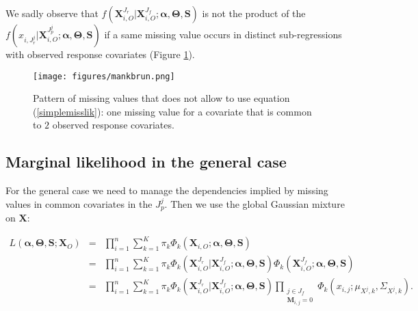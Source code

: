 \documentclass[12pt,a4paper]{report}
\begin{document}
		We sadly observe that $f(\boldsymbol{X}^{J_r}_{i,O}|\boldsymbol{X}^{J_f}_{i,O};\boldsymbol{\alpha},\boldsymbol{\Theta},\boldsymbol{S})$ is not the product of the $f(x_{i,J_r^j}|\boldsymbol{X}_{i,O}^{J_p^j};\boldsymbol{\alpha},\boldsymbol{\Theta},\boldsymbol{S}) $	if a same missing value occurs in distinct sub-regressions with observed response covariates (Figure \ref{mankbrun}).
		\begin{figure} 
		\centering
		\texttt{[image: figures/mankbrun.png]} 
		\caption{Pattern of missing values that does not allow to use equation (\ref{simplemisslik}): one missing value for a covariate that is common to $2$ observed response covariates.} \label{mankbrun}
		\end{figure}
	\subsection{Marginal likelihood in the general case}
		For the general case we need to manage the dependencies implied by missing values in common covariates in the $J_p^j$. Then we use the global Gaussian mixture on $\boldsymbol{X}$:
		
\begin{eqnarray}
L(\boldsymbol{\alpha},\boldsymbol{\Theta},\boldsymbol{S};\boldsymbol{X}_O)&=&\prod_{i=1}^n\sum_{k=1}^{K} \pi_{k} \Phi_k(\boldsymbol{X}_{i,O};\boldsymbol{\alpha},\boldsymbol{\Theta},\boldsymbol{S}) \nonumber \\
&=&\prod_{i=1}^n\sum_{k=1}^{K} \pi_{k} \Phi_k(\boldsymbol{X}_{i,O}^{J_r}|\boldsymbol{X}_{i,O}^{J_f};\boldsymbol{\alpha},\boldsymbol{\Theta},\boldsymbol{S})\Phi_k(\boldsymbol{X}_{i,O}^{J_f};\boldsymbol{\alpha},\boldsymbol{\Theta},\boldsymbol{S})  \nonumber \\
&=&\prod_{i=1}^n\sum_{k=1}^{K} \pi_{k} \Phi_k(\boldsymbol{X}_{i,O}^{J_r}|\boldsymbol{X}_{i,O}^{J_f};\boldsymbol{\alpha},\boldsymbol{\Theta},\boldsymbol{S})\prod_{\substack{j \in J_f \\ \boldsymbol{M}_{i,j}=0}}\Phi_k(x_{i,j};\mu_{X^j,k},\Sigma_{X^j,k}). \qquad \qquad \label{liklihoodmissglobal}
\end{eqnarray}		

\end{document}
